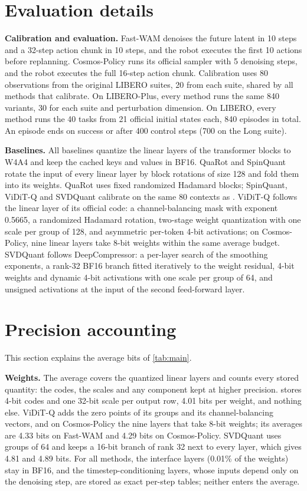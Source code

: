 \section{Evaluation details}
\label{sec:supp:eval}
\noindent\textbf{Calibration and evaluation.}
Fast-WAM denoises the future latent in 10 steps and a 32-step action chunk in 10 steps, and the robot executes the first 10 actions before replanning.
Cosmos-Policy runs its official sampler with 5 denoising steps, and the robot executes the full 16-step action chunk.
Calibration uses 80 observations from the original LIBERO suites, 20 from each suite, shared by all methods that calibrate.
On LIBERO-Plus, every method runs the same 840 variants, 30 for each suite and perturbation dimension.
On LIBERO, every method runs the 40 tasks from 21 official initial states each, 840 episodes in total.
An episode ends on success or after 400 control steps (700 on the Long suite).

\noindent\textbf{Baselines.}
All baselines quantize the linear layers of the transformer blocks to W4A4 and keep the cached keys and values in BF16.
QuaRot and SpinQuant rotate the input of every linear layer by block rotations of size 128 and fold them into its weights.
QuaRot uses fixed randomized Hadamard blocks; SpinQuant,
ViDiT-Q and SVDQuant calibrate on the same 80 contexts as \method.
ViDiT-Q follows the linear layer of its official code: a channel-balancing mask with exponent 0.5665, a randomized Hadamard rotation, two-stage weight quantization with one scale per group of 128, and asymmetric per-token 4-bit activations; on Cosmos-Policy, nine linear layers take 8-bit weights within the same average budget.
SVDQuant follows DeepCompressor: a per-layer search of the smoothing exponents, a rank-32 BF16 branch fitted iteratively to the weight residual, 4-bit weights and dynamic 4-bit activations with one scale per group of 64, and unsigned activations at the input of the second feed-forward layer.

\section{Precision accounting}
\label{sec:supp:bits}
This section explains the average bits of \cref{tab:main}.

\noindent\textbf{Weights.}
The average covers the quantized linear layers and counts every stored quantity: the codes, the scales and any component kept at higher precision.
\method stores 4-bit codes and one 32-bit scale per output row, 4.01 bits per weight, and nothing else.
ViDiT-Q adds the zero points of its groups and its channel-balancing vectors, and on Cosmos-Policy the nine layers that take 8-bit weights; its averages are 4.33 bits on Fast-WAM and 4.29 bits on Cosmos-Policy.
SVDQuant uses groups of 64 and keeps a 16-bit branch of rank 32 next to every layer, which gives 4.81 and 4.89 bits.
For all methods, the interface layers (0.01\% of the weights) stay in BF16, and the timestep-conditioning layers, whose inputs depend only on the denoising step, are stored as exact per-step tables; neither enters the average.

